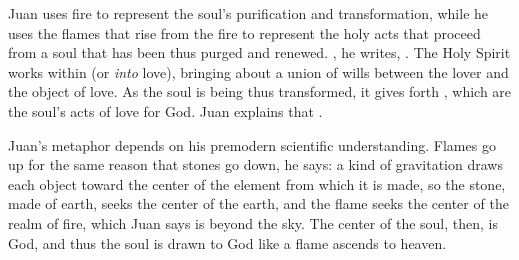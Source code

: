 Juan uses fire to represent the soul's purification and transformation, while
he uses the flames that rise from the fire to represent the holy acts that
proceed from a soul that has been thus purged and renewed.
, he writes, .%
    \Autocite[790]{JuandelaCruz:Llama} 
The Holy Spirit works within  (or
\emph{into} love), bringing about a union of wills between the lover and the
object of love.
As the soul is being thus transformed, it gives forth , which
are the soul's acts of love for God.
Juan explains that .%
    \Autocite[790]{JuandelaCruz:Llama}


Juan's metaphor depends on his premodern scientific understanding. 
Flames go up for the same reason that stones go down, he says: a kind of
gravitation draws each object toward the center of the element from which it is
made, so the stone, made of earth, seeks the center of the earth, and the flame
seeks the center of the realm of fire, which Juan says is beyond the sky.%
    \Autocite[792--795]{JuandelaCruz:Llama}
The center of the soul, then, is God, and thus the soul is drawn to God like a
flame ascends to heaven.

